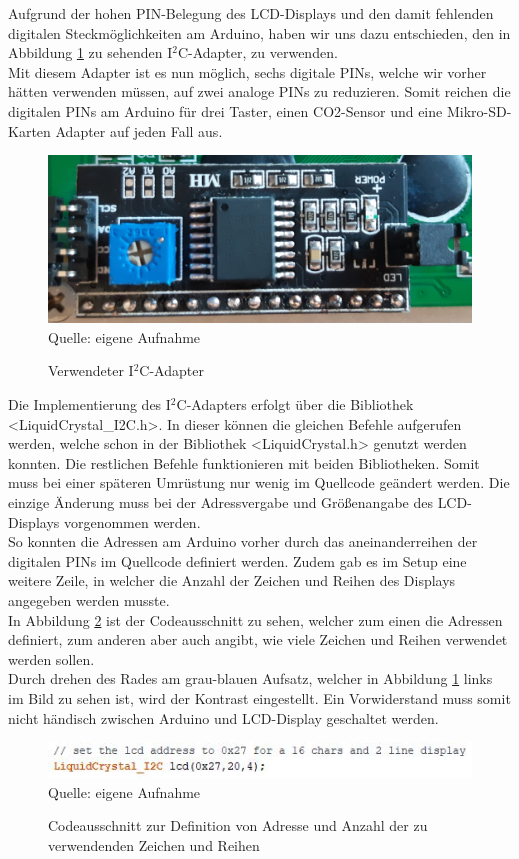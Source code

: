 \label{I2CAdapter}

Aufgrund der hohen PIN-Belegung des \ac{LCD}-Displays und den damit fehlenden digitalen Steckmöglichkeiten am Arduino, haben wir uns dazu entschieden, den in Abbildung \ref{fig:I2CAdapter} zu sehenden I$^2$C-Adapter, zu verwenden. \\
Mit diesem Adapter ist es nun möglich, sechs digitale PINs, welche wir vorher hätten verwenden müssen, auf zwei analoge PINs zu reduzieren. Somit reichen die digitalen PINs am Arduino für drei Taster, einen CO2-Sensor und eine Mikro-SD-Karten Adapter auf jeden Fall aus. \\

\begin{figure}[!hbt]
	\centering
	\includegraphics[width=0.6\linewidth]{Images/I2CAdapter}
	\footnotesize \\Quelle: eigene Aufnahme
	\caption{Verwendeter I$^2$C-Adapter}
	\label{fig:I2CAdapter}
\end{figure}

Die Implementierung des I$^2$C-Adapters erfolgt über die Bibliothek <LiquidCrystal\_I2C.h>. In dieser können die gleichen Befehle aufgerufen werden, welche schon in der Bibliothek <LiquidCrystal.h> genutzt werden konnten. Die restlichen Befehle funktionieren mit beiden Bibliotheken. Somit muss bei einer späteren Umrüstung nur wenig im Quellcode geändert werden. Die einzige Änderung muss bei der Adressvergabe und Größenangabe des \ac{LCD}-Displays vorgenommen werden. \\
So konnten die Adressen am Arduino vorher durch das aneinanderreihen der digitalen PINs im Quellcode definiert werden. Zudem gab es im Setup eine weitere Zeile, in welcher die Anzahl der Zeichen und Reihen des Displays angegeben werden musste. \\
In Abbildung \ref{fig:I2CAdressen} ist der Codeausschnitt zu sehen, welcher zum einen die Adressen definiert, zum anderen aber auch angibt, wie viele Zeichen und Reihen verwendet werden sollen. \\
Durch drehen des Rades am grau-blauen Aufsatz, welcher in Abbildung \ref{fig:I2CAdapter} links im Bild zu sehen ist, wird der Kontrast eingestellt. Ein Vorwiderstand muss somit nicht händisch zwischen Arduino und \ac{LCD}-Display geschaltet werden.

\begin{figure}[!hbt]
	\centering
	\includegraphics[width=0.7\linewidth]{Images/I2CAdressen}
	\footnotesize \\Quelle: eigene Aufnahme
	\caption{Codeausschnitt zur Definition von Adresse und Anzahl der zu verwendenden Zeichen und Reihen}
	\label{fig:I2CAdressen}
\end{figure}
